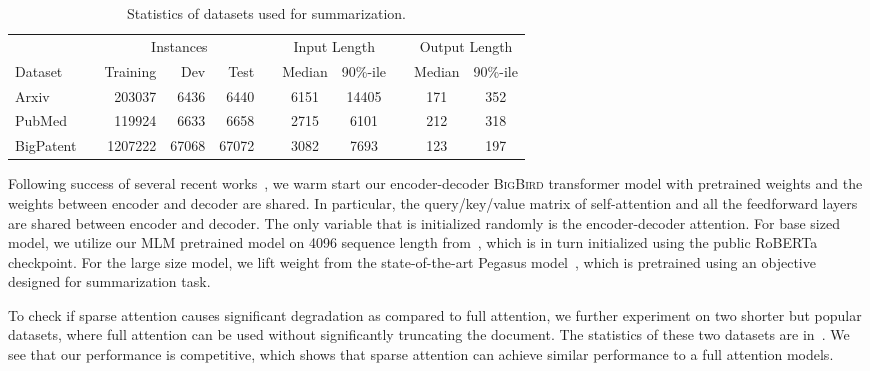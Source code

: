 \documentclass{article}
\newcommand{\bigb}{\textsc{BigBird}\xspace}
\begin{document}
\begin{table}[bht]
    \centering
    \small
    \begin{tabular}{@{}lrrrrrccrcc@{}}
    \toprule
    & & \multicolumn{3}{c}{Instances} & & \multicolumn{2}{c}{Input Length}& & \multicolumn{2}{c}{Output Length} \\
    \cmidrule{3-5} \cmidrule{7-8} \cmidrule{10-11}
    Dataset & & Training & Dev & Test & & Median & 90\%-ile & &  Median & 90\%-ile \\
    \midrule
       Arxiv \citep{cohan2018discourse} & & 203037 & 6436 & 6440 & & 6151 & 14405 & & 171 & 352 \\
       PubMed \citep{cohan2018discourse} & & 119924 & 6633 & 6658 & & 2715 & 6101 & & 212 & 318 \\
       BigPatent \citep{sharma2019bigpatent} & &  1207222 & 67068 & 67072 & & 3082 & 7693  & & 123 & 197  \\
    \bottomrule
    \end{tabular}
    \vspace{2mm}
     \caption{Statistics of datasets used for summarization.}
    \label{tab:long_sum_data}
\end{table}

Following success of several recent works~\citep{rothe2019leveraging,liu2019roberta}, we warm start our encoder-decoder \bigb transformer model with pretrained weights and the weights between encoder and decoder are shared.
In particular, the query/key/value matrix of self-attention and all the feedforward layers are shared between encoder and decoder.
The only variable that is initialized randomly is the encoder-decoder attention.
For base sized model, we utilize our MLM pretrained model on 4096 sequence length from~, which is in turn initialized using the public RoBERTa checkpoint.
For the large size model, we lift weight from the state-of-the-art Pegasus model~\citep{zhang2019pegasus}, which is pretrained using an objective designed for summarization task.


To check if sparse attention causes significant degradation as compared to full attention, we further experiment on two shorter but popular datasets, where full attention can be used without significantly truncating the document. 
The statistics of these two datasets are in~.
We see that our performance is competitive, which shows that sparse attention can achieve similar performance to a full attention models. 
\end{document}
